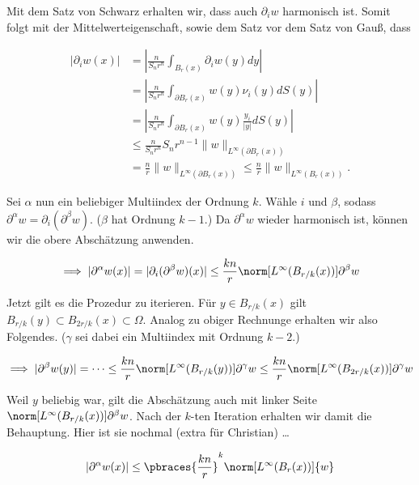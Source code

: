 \begin{solution}

Mit dem Satz von Schwarz erhalten wir, dass auch $\partial_i w$ harmonisch ist.
Somit folgt mit der Mittelwerteigenschaft, sowie dem Satz vor dem Satz von Gauß, dass

\begin{align*}
  |\partial_iw(x)|
  & =
  \left|\frac{n}{S_nr^n}\int_{B_{r}(x)}\partial_iw(y) dy\right| \\
  & =
  \left|\frac{n}{S_nr^n}\int_{\partial B_{r}(x)}w(y)\nu_i(y) dS(y)\right| \\
  & =
  \left|\frac{n}{S_nr^n}\int_{\partial B_{r}(x)}w(y)\frac{y_i}{|y|} dS(y)\right| \\
  & \leq
  \frac{n}{S_nr^n}S_nr^{n-1}\|w\|_{L^\infty(\partial B_{r}(x))} \\
  & =
  \frac{n}{r}\|w\|_{L^\infty(\partial B_{r}(x))} \leq \frac{n}{r}\|w\|_{L^\infty(B_{r}(x))}.
\end{align*}

Sei $\alpha$ nun ein beliebiger Multiindex der Ordnung $k$.
Wähle $i$ und $\beta$, sodass $\partial^\alpha w = \partial_i(\partial^\beta w)$.
($\beta$ hat Ordnung $k-1$.)
Da $\partial^\alpha w$ wieder harmonisch ist, können wir die obere Abschätzung anwenden.

\begin{align*}
  \implies
  |\partial^\alpha w(x)|
  =
  |\partial_i (\partial^\beta w)(x)|
  \leq
  \frac{kn}{r}
  \norm
  [
    L^\infty( B_{r/k}(x))
  ]
  {\partial^\beta w}
\end{align*}

Jetzt gilt es die Prozedur zu iterieren.
Für $y \in B_{r/k}(x)$ gilt $B_{r/k}(y) \subset B_{2r/k}(x) \subset \Omega$.
Analog zu obiger Rechnunge erhalten wir also Folgendes.
($\gamma$ sei dabei ein Multiindex mit Ordnung $k-2$.)

\begin{align*}
  \implies
  |\partial^\beta w(y)|
  =
  \cdots
  \leq
  \frac{kn}{r}
  \norm
  [
    L^\infty(B_{r/k}(y))
  ]
  {\partial^\gamma w}
  \leq
  \frac{kn}{r}
  \norm
  [
    L^\infty(B_{2r/k}(x))
  ]
  {\partial^\gamma w}
\end{align*}

Weil $y$ beliebig war, gilt die Abschätzung auch mit linker Seite $\norm[L^\infty( B_{r/k}(x))]{\partial^\beta w}$.
Nach der $k$-ten Iteration erhalten wir damit die Behauptung.
Hier ist sie nochmal (extra für Christian) \dots

\begin{align*}
  |\partial^\alpha w(x)|
  \leq
  \pbraces
  {
      \frac{kn}{r}
  }^k
  \norm[L^\infty(B_r(x))]{w}
\end{align*}

\end{solution}

